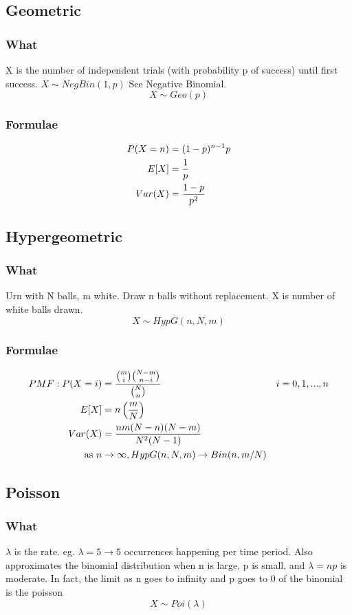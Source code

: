 \documentclass[12pt]{amsart}
\begin{document}
\subsection{Geometric}
\subsubsection{What}
X is the number of independent trials (with probability p of success) until first success. $X \sim NegBin(1, p)$ See Negative Binomial.
\[
X \sim Geo(p)
\]
\subsubsection{Formulae}
\begin{align*}
P(X = n) &= (1-p)^{n-1} p \\
E[X] &= {1 \over p} \\
Var(X) &= {1 - p \over p^2}
\end{align*}
%
\subsection{Hypergeometric}
\subsubsection{What}
Urn with N balls, m white. Draw n balls without replacement. X is number of white balls drawn.
\[
X \sim HypG(n, N, m)
\]
\subsubsection{Formulae}
\begin{align*}
PMF: P(X = i) &= { {m \choose i} {N-m \choose n-i} \over {N \choose n}} &i=0,1,...,n \\
E[X] &= n \left( {m \over N} \right) \\
Var(X) &= {nm(N-n)(N-m) \over N^2 (N-1)} \\
\text{as } n &\to \infty, HypG(n, N, m) \to Bin(n, m/N)
\end{align*}
%
\subsection{Poisson}
\subsubsection{What}
$\lambda$ is the rate. eg. $\lambda = 5 \to 5$ occurrences happening per time period. Also approximates the binomial distribution when n is large, p is small, and $\lambda = np$ is moderate. In fact, the limit as n goes to infinity and p goes to 0 of the binomial is the poisson
\[
X \sim Poi(\lambda)
\]
\end{document}
